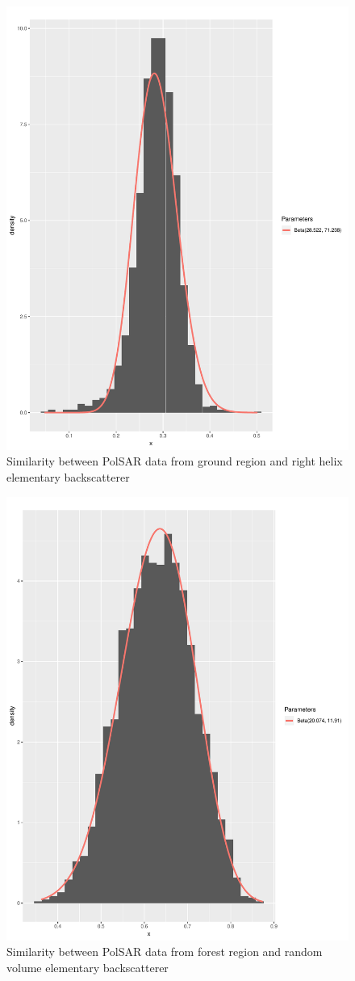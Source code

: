 \documentclass[conference]{IEEEtran}
\begin{document}
\begin{figure}[!ht]
    \centering
    \includegraphics[width = .9\linewidth, height = .7\linewidth]{../../../Figures/paper_19_05/rh_ground.pdf}
    \caption{Similarity between PolSAR data from ground region and right helix elementary backscatterer}
    \label{fig:gr_rh}
\end{figure}

\begin{figure}[!ht]
    \centering
    \includegraphics[width = .9\linewidth, height = .7\linewidth]{../../../Figures/paper_19_05/rv_vegetation.pdf}
    \caption{Similarity between PolSAR data from forest region and random volume elementary backscatterer}
    \label{fig:fr_rv}
\end{figure}
\end{document}

